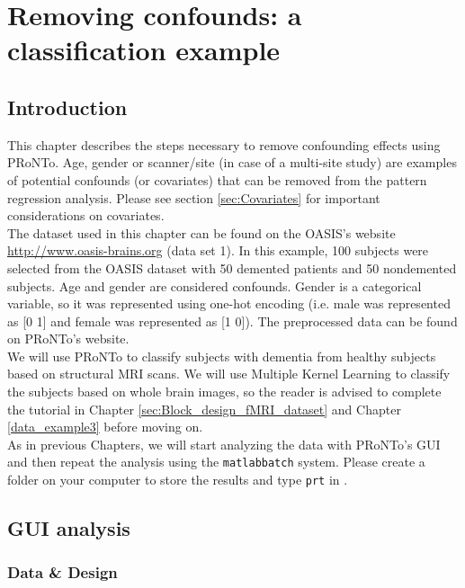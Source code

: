 
\chapter{Removing confounds: a classification example}
\label{sec:confounds_clas}
\minitoc

\section{Introduction}

This chapter describes the steps necessary to remove confounding effects using PRoNTo. Age, gender or scanner/site (in case of a multi-site study) are examples of potential confounds (or covariates) that can be removed from the pattern regression analysis. Please see section \ref{sec:Covariates} for important considerations on covariates.
\\

The dataset used in this chapter can be found on the OASIS's website \url{http://www.oasis-brains.org} (data set 1). In this example, 100 subjects were selected from the OASIS dataset with 50 demented patients and 50 nondemented subjects. Age and gender are considered confounds. Gender is a categorical variable, so it was represented using one-hot encoding (i.e. male was represented as [0 1] and female was represented as [1 0]). The preprocessed data can be found on PRoNTo's website.
\\

We will use PRoNTo to classify subjects with dementia from healthy subjects based on structural MRI scans. We will use Multiple Kernel Learning to classify the subjects based on whole brain images, so the reader is advised to complete the tutorial in Chapter \ref{sec:Block_design_fMRI_dataset} and Chapter \ref{data_example3} before moving on.
\\
 
As in previous Chapters, we will start analyzing the data with PRoNTo's GUI and then repeat the analysis using the {\tt matlabbatch}  system. Please create a folder on your computer to store the results and type {\tt prt} in \matlab{}.

\section{GUI analysis}

\subsection{Data \& Design}

